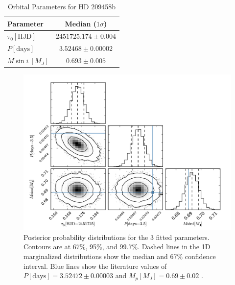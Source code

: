 \documentclass[11pt]{paper}
\begin{document}
\begin{table}
    \begin{center}
        \caption{Orbital Parameters for HD 209458b}\label{tab:bf}
        \begin{tabular}{lc}
            \hline\hline
            Parameter & Median ($1\sigma$) \\
            \hline
            $\tau_0 [\mathrm{HJD}]$ & $2451725.174\pm0.004$ \\
            $P [\mathrm{days}]$ & $3.52468\pm0.00002$ \\
            $M\sin i~[M_J]$ & $0.693\pm0.005$ \\
            \hline
        \end{tabular}
    \end{center}
\end{table}

\begin{figure}
\begin{center}
    \includegraphics[width=\textwidth]{outputs/corner.pdf}
    \caption{Posterior probability distributions for the 3 fitted parameters. Contours are at 67\%, 95\%, and 99.7\%. Dashed lines in the 1D marginalized distributions show the median and 67\% confidence interval. Blue lines show the literature values of $P[\mathrm{days}]=3.52472\pm0.00003$ and $M_p[M_J]=0.69\pm0.02$ \citep{e}.}
    \label{fig:corner}
\end{center}
\end{figure}
\end{document}
